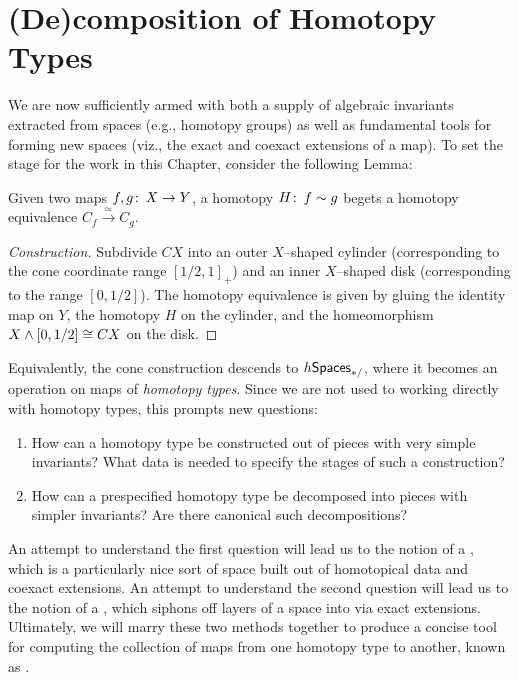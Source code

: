 
\chapter{(De)composition of Homotopy Types}

We are now sufficiently armed with both a supply of algebraic invariants extracted from spaces (e.g., homotopy groups) as well as fundamental tools for forming new spaces (viz., the exact and coexact extensions of a map).
To set the stage for the work in this Chapter, consider the following Lemma:

\begin{lemma}
Given two maps $f, g\colon\thinspace X \to Y$, a homotopy $H\colon\thinspace f \sim g$ begets a homotopy equivalence $C_f \xrightarrow{\simeq} C_g$.
\end{lemma}
\begin{proof}[Construction]
Subdivide $CX$ into an outer $X$--shaped cylinder (corresponding to the cone coordinate range $[1/2, 1]_+$) and an inner $X$--shaped disk (corresponding to the range $[0, 1/2]$).
The homotopy equivalence is given by gluing the identity map on $Y$, the homotopy $H$ on the cylinder, and the homeomorphism $X \wedge [0, 1/2] \cong CX$ on the disk.
\end{proof}

Equivalently, the cone construction descends to $h\mathsf{Spaces}_{*/}$, where it becomes an operation on maps of \emph{homotopy types}.
Since we are not used to working directly with homotopy types, this prompts new questions:
\begin{enumerate}
    \item
    How can a homotopy type be constructed out of pieces with very simple invariants?
    What data is needed to specify the stages of such a construction?
    \item
    How can a prespecified homotopy type be decomposed into pieces with simpler invariants?
    Are there canonical such decompositions?
\end{enumerate}
An attempt to understand the first question will lead us to the notion of a , which is a particularly nice sort of space built out of homotopical data and coexact extensions.
An attempt to understand the second question will lead us to the notion of a , which siphons off layers of a space into  via exact extensions.
Ultimately, we will marry these two methods together to produce a concise tool for computing the collection of maps from one homotopy type to another, known as .





